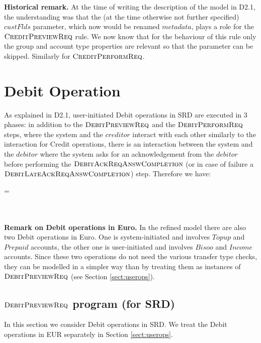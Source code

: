 {\bf Historical remark.} At the time of writing the description of the model in D2.1, the understanding was that the (at the time otherwise not further specified) $custFlds$ parameter, which now would be renamed $metadata$, plays a role for the $\hbox{\sc CreditPreviewReq}$ rule. We now know that for the behaviour of this rule only the group and account type properties are relevant so that the parameter can be skipped. Similarly for $\hbox{\sc CreditPerformReq}$.


\section{Debit Operation} 
\label{sect:debitops}

As explained in D2.1, user-initiated Debit operations in SRD are executed in 3 phases: in addition to the $\hbox{\sc DebitPreviewReq}$ and the $\hbox{\sc DebitPerformReq}$ steps, where the system and the $creditor$ interact with each other similarly to the interaction for Credit operations, there is an interaction between the system and the $debitor$ where the system asks for an acknowledgement from the $debitor$ before performing the $\hbox{\sc DebitAckReqAnswCompletion}$ (or in case of failure a $\hbox{\sc DebitLateAckReqAnswCompletion}$) step. Therefore we have:

\begin{asm}
=\+
    \\
    \\
   \\
\end{asm}

{\bf Remark on Debit operations in Euro.} In the refined model there are also two Debit operations in Euro. One is system-initiated and involves $Topup$ and $Prepaid$ accounts, the other one is user-initiated  and involves $Bisoo$ and $Income$ accounts. Since these two operations do not need the various transfer type checks, they can be modelled in a simpler way than by treating them as instances of $\hbox{\sc DebitPreviewReq}$ (see Section \ref{sect:userops}).

\subsection{$\hbox{\sc DebitPreviewReq}$ program (for SRD)}
\label{sect:debitpreview}

In this section we consider Debit operations in SRD. We treat the Debit operations in EUR separately in Section \ref{sect:userops}.

